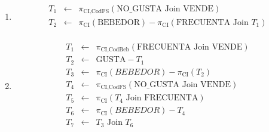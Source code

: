 \documentclass[12pt]{article}
\newcommand{\asig}{\ensuremath{\leftarrow}}
\begin{document}
\begin{enumerate}
 \item 

\begin{eqnarray*}
 T_1 & \asig & \pi_{\text{CI,CodFS}}(\text{NO\_GUSTA} \text{ Join } \text{VENDE}) \\
 T_2 & \asig & \pi_{\text{CI}}(\text{BEBEDOR}) - \pi_{\text{CI}}(\text{FRECUENTA} \text{ Join } T_1) \\
\end{eqnarray*}

 \item 

\begin{eqnarray*}
 T_1 & \asig & \pi_{\text{CI,CodBeb}}(\text{FRECUENTA} \text{ Join } \text{VENDE}) \\
 T_2 & \asig & \text{GUSTA} -T_1 \\
 T_3 & \asig & \pi_{\text{CI}}(BEBEDOR) - \pi_{\text{CI}}(T_2) \\
 T_4 & \asig & \pi_{\text{CI,CodFS}}(\text{NO\_GUSTA} \text{ Join } \text{VENDE}) \\
 T_5 & \asig & \pi_{\text{CI}}(T_4 \text{ Join } \text{FRECUENTA}) \\
 T_6 & \asig & \pi_{\text{CI}}(BEBEDOR) - T_4 \\
 T_7 & \asig & T_3 \text { Join } T_6 \\
\end{eqnarray*}

\end{enumerate}
\end{document}
